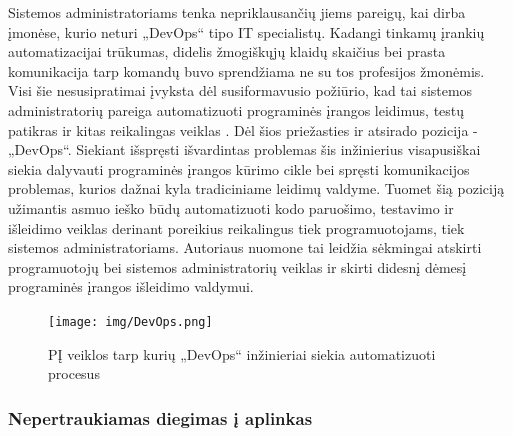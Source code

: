 \documentclass{VUMIFPSkursinis}
\begin{document}
Sistemos administratoriams tenka nepriklausančių jiems pareigų, kai dirba įmonėse, kurio neturi „DevOps“ tipo IT specialistų. Kadangi tinkamų įrankių automatizacijai trūkumas, didelis žmogiškųjų klaidų skaičius bei prasta komunikacija tarp komandų buvo sprendžiama ne su tos profesijos žmonėmis. Visi šie nesusipratimai įvyksta dėl susiformavusio požiūrio, kad tai sistemos administratorių pareiga automatizuoti programinės įrangos leidimus, testų patikras ir kitas reikalingas veiklas \cite{SaltTrecias}. Dėl šios priežasties ir atsirado pozicija - „DevOps“. Siekiant išspręsti išvardintas problemas šis inžinierius visapusiškai siekia dalyvauti programinės įrangos kūrimo cikle bei spręsti komunikacijos problemas, kurios dažnai kyla tradiciniame leidimų valdyme. Tuomet šią poziciją užimantis asmuo ieško būdų automatizuoti kodo paruošimo, testavimo ir išleidimo veiklas derinant poreikius reikalingus tiek programuotojams, tiek sistemos administratoriams. Autoriaus nuomone tai leidžia sėkmingai atskirti programuotojų bei sistemos administratorių veiklas ir skirti didesnį dėmesį programinės įrangos išleidimo valdymui.

\begin{figure}[H]
    \centering
    \texttt{[image: img/DevOps.png]}
    \caption{PĮ veiklos tarp kurių „DevOps“ inžinieriai siekia automatizuoti procesus}
    \label{img:mlp}
\end{figure}

    \subsubsection{Nepertraukiamas diegimas į aplinkas}
    
\end{document}
